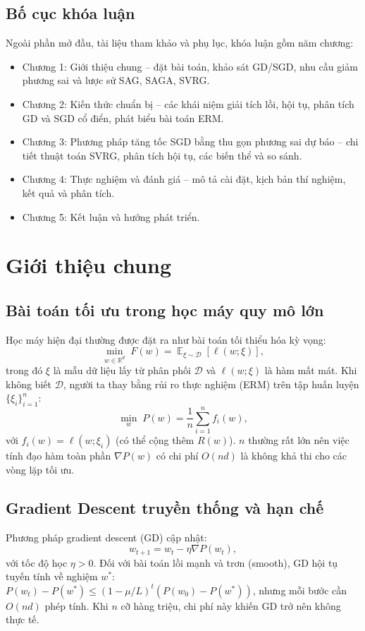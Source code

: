 \documentclass[12pt,a4paper]{report}
\theoremstyle{definition}
\DeclareMathOperator*{\E}{\mathbb{E}}
\begin{document}
\section*{Bố cục khóa luận}
Ngoài phần mở đầu, tài liệu tham khảo và phụ lục, khóa luận gồm năm chương:
\begin{itemize}
    \item Chương 1: Giới thiệu chung – đặt bài toán, khảo sát GD/SGD, nhu cầu giảm phương sai và lược sử SAG, SAGA, SVRG.
    \item Chương 2: Kiến thức chuẩn bị – các khái niệm giải tích lồi, hội tụ, phân tích GD và SGD cổ điển, phát biểu bài toán ERM.
    \item Chương 3: Phương pháp tăng tốc SGD bằng thu gọn phương sai dự báo – chi tiết thuật toán SVRG, phân tích hội tụ, các biến thể và so sánh.
    \item Chương 4: Thực nghiệm và đánh giá – mô tả cài đặt, kịch bản thí nghiệm, kết quả và phân tích.
    \item Chương 5: Kết luận và hướng phát triển.
\end{itemize}

\chapter{Giới thiệu chung}

\section{Bài toán tối ưu trong học máy quy mô lớn}
Học máy hiện đại thường được đặt ra như bài toán tối thiểu hóa kỳ vọng:
\begin{equation}
\min_{w\in\mathbb{R}^d} \; F(w) = \E_{\xi\sim\mathcal{D}}[\ell(w;\xi)],
\end{equation}
trong đó $\xi$ là mẫu dữ liệu lấy từ phân phối $\mathcal{D}$ và $\ell(w;\xi)$ là hàm mất mát. Khi không biết $\mathcal{D}$, người ta thay bằng rủi ro thực nghiệm (ERM) trên tập huấn luyện $\{\xi_i\}_{i=1}^{n}$:
\begin{equation}
\min_{w} \; P(w) = \frac{1}{n}\sum_{i=1}^{n} f_i(w),
\label{eq:erm}
\end{equation}
với $f_i(w) = \ell(w;\xi_i)$ (có thể cộng thêm $R(w)$). $n$ thường rất lớn nên việc tính đạo hàm toàn phần $\nabla P(w)$ có chi phí $O(n d)$ là không khả thi cho các vòng lặp tối ưu.

\section{Gradient Descent truyền thống và hạn chế}
Phương pháp gradient descent (GD) cập nhật:
\begin{equation}
w_{t+1} = w_t - \eta \nabla P(w_t),
\end{equation}
với tốc độ học $\eta > 0$. Đối với bài toán lồi mạnh và trơn (smooth), GD hội tụ tuyến tính về nghiệm $w^*$: $P(w_t) - P(w^*) \le (1 - \mu/L)^t (P(w_0)-P(w^*))$, nhưng mỗi bước cần $O(n d)$ phép tính. Khi $n$ cỡ hàng triệu, chi phí này khiến GD trở nên không thực tế.
\end{document}
